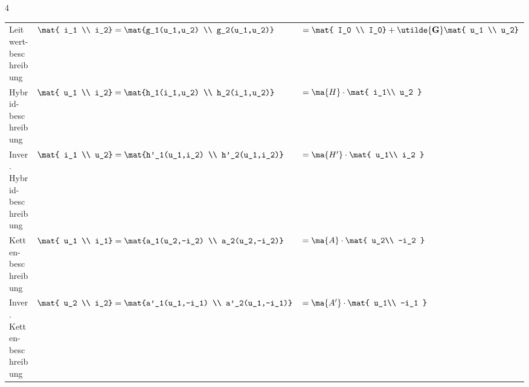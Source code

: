 \documentclass[fs, footer]{latex4ei}
\begin{document}
\begin{multicols*}{4}
\begin{tabular}{@{}p{1.3cm}|ll@{}}
        Leitwert-beschreibung       & $\mat{ i_1                                                                                                                                                                     \\ i_2} = \mat{g_1(u_1,u_2) \\ g_2(u_1,u_2)}$     & $= \mat{ I_0 \\ I_0} + \utilde{ \bf G} \mat{ u_1 \\ u_2} $                                                              \\ \mrule
        Hybrid-beschreibung         & $\mat{ u_1                                                                                                                                                                     \\ i_2} = \mat{h_1(i_1,u_2) \\ h_2(i_1,u_2)} $    & $= \ma{H} \cdot \mat{ i_1\\ u_2 }$                                                                                      \\ \mrule
        Inver. Hybrid- beschreibung & $\mat{ i_1                                                                                                                                                                     \\ u_2} = \mat{h'_1(u_1,i_2) \\ h'_2(u_1,i_2)}$   & $= \ma{H'} \cdot \mat{ u_1\\ i_2 }$                                                                                     \\ \mrule
        Ketten-beschreibung         & $\mat{ u_1                                                                                                                                                                     \\ i_1} = \mat{a_1(u_2,-i_2) \\ a_2(u_2,-i_2)}$   & $= \ma{A} \cdot \mat{ u_2\\ -i_2 }$                                                                                     \\ \mrule
        Inver. Ketten- beschreibung & $\mat{ u_2                                                                                                                                                                     \\ i_2} = \mat{a'_1(u_1,-i_1) \\ a'_2(u_1,-i_1)}$ & $= \ma{A'} \cdot \mat{ u_1\\ -i_1 }$
    \end{tabular}\\


\end{multicols*}
\end{document}
